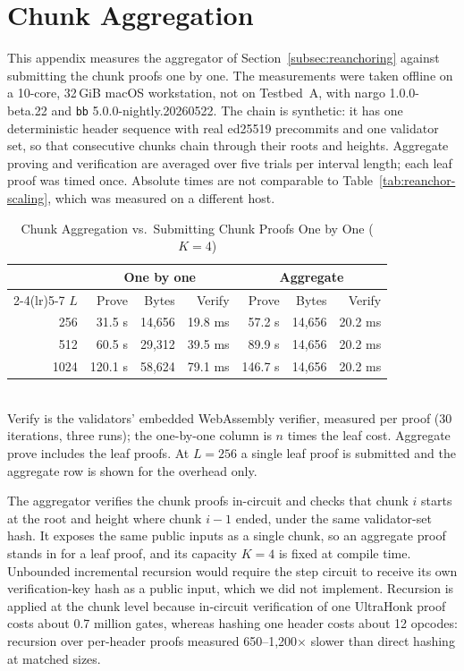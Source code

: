 \section{Chunk Aggregation}
\label{app:aggregation}

This appendix measures the aggregator of Section~\ref{subsec:reanchoring}
against submitting the chunk proofs one by one. The measurements were taken
offline on a 10-core, 32\,GiB macOS workstation, not on Testbed~A, with
nargo 1.0.0-beta.22 and \texttt{bb} 5.0.0-nightly.20260522. The chain is
synthetic: it has one deterministic header sequence with real ed25519
precommits and one validator set, so that consecutive chunks chain through
their roots and heights. Aggregate proving and verification are averaged over
five trials per interval length; each leaf proof was timed once. Absolute times
are not comparable to Table~\ref{tab:reanchor-scaling}, which was measured on a
different host.

\begin{table}[h]
\caption{Chunk Aggregation vs.\ Submitting Chunk Proofs One by One ($K{=}4$)}
\label{tab:aggregation}
\centering
\footnotesize
\begin{tabular}{@{}rrrrrrr@{}}
\toprule
 & \multicolumn{3}{c}{\textbf{One by one}} & \multicolumn{3}{c}{\textbf{Aggregate}} \\
\cmidrule(lr){2-4}\cmidrule(lr){5-7}
$L$ & Prove & Bytes & Verify & Prove & Bytes & Verify \\
\midrule
256  & 31.5 s  & 14{,}656 & 19.8 ms & 57.2 s  & 14{,}656 & 20.2 ms \\
512  & 60.5 s  & 29{,}312 & 39.5 ms & 89.9 s  & 14{,}656 & 20.2 ms \\
1024 & 120.1 s & 58{,}624 & 79.1 ms & 146.7 s & 14{,}656 & 20.2 ms \\
\bottomrule
\end{tabular}
\\[2pt]
\footnotesize Verify is the validators' embedded WebAssembly verifier, measured
per proof (30 iterations, three runs); the one-by-one column is $n$ times the
leaf cost. Aggregate prove includes the leaf proofs. At $L{=}256$ a single
leaf proof is submitted and the aggregate row is shown for the overhead only.
\end{table}

The aggregator verifies the chunk proofs in-circuit and checks that chunk
$i$ starts at the root and height where chunk $i{-}1$ ended, under the same
validator-set hash. It exposes the same public inputs as a single chunk, so an
aggregate proof stands in for a leaf proof, and its capacity $K{=}4$ is fixed
at compile time. Unbounded incremental recursion would require the step circuit
to receive its own verification-key hash as a public input, which we did not
implement. Recursion is applied at the chunk level because in-circuit
verification of one UltraHonk proof costs about 0.7 million gates, whereas
hashing one header costs about 12 opcodes: recursion over per-header proofs
measured 650--1{,}200$\times$ slower than direct hashing at matched sizes.

